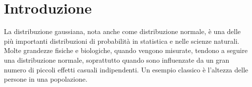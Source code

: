 \section{Introduzione}
La distribuzione gaussiana, nota anche come distribuzione normale, è una delle più importanti distribuzioni di probabilità in statistica e nelle scienze naturali. Molte grandezze fisiche e biologiche, quando vengono misurate, tendono a seguire una distribuzione normale, soprattutto quando sono influenzate da un gran numero di piccoli effetti casuali indipendenti. Un esempio classico è l'altezza delle persone in una popolazione.

